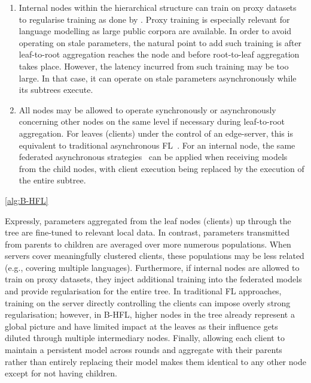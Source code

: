 \begin{enumerate}
    \item Internal nodes within the hierarchical structure can train on proxy datasets to regularise training as done by \citet{OneShotFL,FLwithNonIID}. Proxy training is especially relevant for language modelling as large public corpora are available. In order to avoid operating on stale parameters, the natural point to add such training is after leaf-to-root aggregation reaches the node and before root-to-leaf aggregation takes place. However, the latency incurred from such training may be too large. In that case, it can operate on stale parameters asynchronously while its subtrees execute.
    \item All nodes may be allowed to operate synchronously or asynchronously concerning other nodes on the same level if necessary during leaf-to-root aggregation. For leaves (clients) under the control of an edge-server, this is equivalent to traditional asynchronous FL~\citep{AsynchronousFLonHetDevicesSurvey}. For an internal node, the same federated asynchronous strategies~\citep{FedBuff,PAPAYA} can be applied when receiving models from the child nodes, with client execution being replaced by the execution of the entire subtree.
\end{enumerate}


\cref{alg:B-HFL}


Expressly, parameters aggregated from the leaf nodes (clients) up through the tree are fine-tuned to relevant local data. In contrast, parameters transmitted from parents to children are averaged over more numerous populations. When servers cover meaningfully clustered clients, these populations may be less related (e.g., covering multiple languages). Furthermore, if internal nodes are allowed to train on proxy datasets, they inject additional training into the federated models and provide regularisation for the entire tree. In traditional FL approaches, training on the server directly controlling the clients can impose overly strong regularisation; however, in B-HFL, higher nodes in the tree already represent a global picture and have limited impact at the leaves as their influence gets diluted through multiple intermediary nodes. Finally, allowing each client to maintain a persistent model across rounds and aggregate with their parents rather than entirely replacing their model makes them identical to any other node except for not having children.

